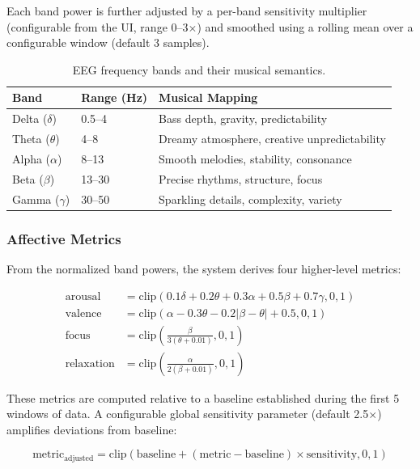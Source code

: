 \documentclass[manuscript,review,anonymous]{acmart}
\begin{document}
Each band power is further adjusted by a per-band sensitivity multiplier (configurable from the UI, range 0--3$\times$) and smoothed using a rolling mean over a configurable window (default 3 samples).

\begin{table}[h]
  \caption{EEG frequency bands and their musical semantics.}
  \label{tab:bands}
  \begin{tabular}{lll}
    \toprule
    Band & Range (Hz) & Musical Mapping \\
    \midrule
    Delta ($\delta$) & 0.5--4 & Bass depth, gravity, predictability \\
    Theta ($\theta$) & 4--8 & Dreamy atmosphere, creative unpredictability \\
    Alpha ($\alpha$) & 8--13 & Smooth melodies, stability, consonance \\
    Beta ($\beta$) & 13--30 & Precise rhythms, structure, focus \\
    Gamma ($\gamma$) & 30--50 & Sparkling details, complexity, variety \\
    \bottomrule
  \end{tabular}
\end{table}

\subsubsection{Affective Metrics}

From the normalized band powers, the system derives four higher-level metrics:

\begin{align}
  \text{arousal} &= \text{clip}(0.1\delta + 0.2\theta + 0.3\alpha + 0.5\beta + 0.7\gamma, 0, 1) \\
  \text{valence} &= \text{clip}(\alpha - 0.3\theta - 0.2|\beta - \theta| + 0.5, 0, 1) \\
  \text{focus} &= \text{clip}\left(\frac{\beta}{3(\theta + 0.01)}, 0, 1\right) \\
  \text{relaxation} &= \text{clip}\left(\frac{\alpha}{2(\beta + 0.01)}, 0, 1\right)
\end{align}

These metrics are computed relative to a baseline established during the first 5 windows of data. A configurable global sensitivity parameter (default 2.5$\times$) amplifies deviations from baseline:

\begin{equation}
  \text{metric}_{\text{adjusted}} = \text{clip}(\text{baseline} + (\text{metric} - \text{baseline}) \times \text{sensitivity}, 0, 1)
\end{equation}
\end{document}
